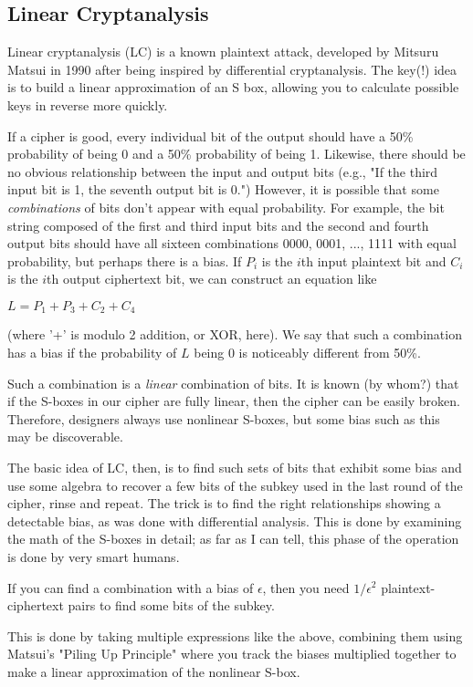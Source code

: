\documentclass[%
 aip,
 jmp,%
 amsmath,amssymb,
 reprint,%
]{revtex4-1}
\begin{document}
\subsection{Linear Cryptanalysis}

Linear cryptanalysis (LC) is a known plaintext attack, developed by
Mitsuru Matsui in 1990 after being inspired by differential
cryptanalysis.  The key(!)  idea is to build a linear approximation of
an S box, allowing you to calculate possible keys in reverse more
quickly.

If a cipher is good, every individual bit of the output should have a
50\% probability of being 0 and a 50\% probability of being 1.
Likewise, there should be no obvious relationship between the input
and output bits (e.g., "If the third input bit is 1, the seventh
output bit is 0.")  However, it is possible that some \emph{combinations}
of bits don't appear with equal probability. For example, the bit
string composed of the first and third input bits and the second and
fourth output bits should have all sixteen combinations 0000, 0001,
..., 1111 with equal probability, but perhaps there is a bias.  If $P_i$
is the $i$th input plaintext bit and $C_i$ is the $i$th output ciphertext
bit, we can construct an equation like

$L = P_1 + P_3 + C_2 + C_4$

(where '+' is modulo 2 addition, or XOR, here).  We say that such a
combination has a bias if the probability of $L$ being 0 is noticeably
different from 50\%.

Such a combination is a \emph{linear} combination of bits.  It is known (by
whom?) that if the S-boxes in our cipher are fully linear, then the
cipher can be easily broken.  Therefore, designers always use
nonlinear S-boxes, but some bias such as this may be discoverable.

The basic idea of LC, then, is to find such sets of bits that exhibit
some bias and use some algebra to recover a few bits of the subkey
used in the last round of the cipher, rinse and repeat.  The trick is
to find the right relationships showing a detectable bias, as was done
with differential analysis.  This is done by examining the math of the
S-boxes in detail; as far as I can tell, this phase of the operation
is done by very smart humans.

If you can find a combination with a bias of $\epsilon$, then you need
$1/\epsilon^2$ plaintext-ciphertext pairs to find some bits of the
subkey.

This is done by taking multiple expressions like the above, combining
them using Matsui's "Piling Up Principle" where you track the biases
multiplied together to make a linear approximation of the nonlinear
S-box.
\end{document}
